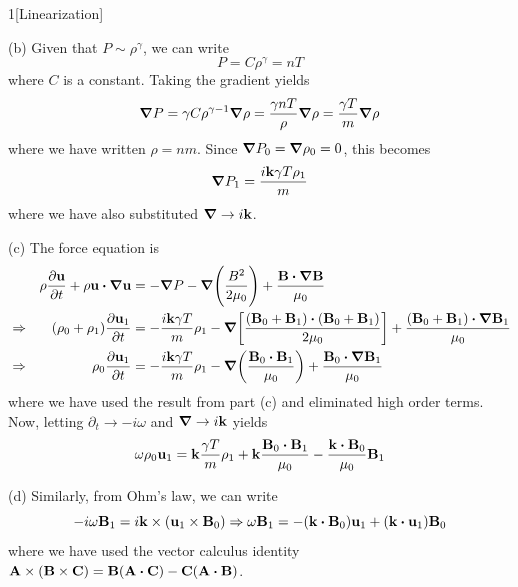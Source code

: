 \documentclass[12pt]{article}
\begin{document}
\begin{problem}{1}[Linearization]
\begin{solution}
(b) Given that $P\sim \rho^\gamma$, we can write
\begin{equation}
    P=C\rho^\gamma=nT 
\end{equation}
where $C$ is a constant. Taking the gradient yields
\begin{equation}
    \grad P=\gamma C\rho^{\gamma-1}\grad\rho =\frac{\gamma nT}{\rho}\grad\rho
    =\frac{\gamma T}{m}\grad\rho
\end{equation}
where we have written $\rho=nm$. Since $\grad P_0=\grad\rho_0=0$, this becomes
\begin{equation}
    \grad P_1=\frac{i\vb{k}\gamma T\rho_1}{m} 
\end{equation}
where we have also substituted $\grad\to i\vb{k}$.

(c) The force equation is
\begin{align}
    &&\rho\frac{\partial\vb{u}}{\partial t}+\rho\vb{u}\vdot\grad\vb{u}
    &=-\grad
    P-\grad\qty(\frac{B^2}{2\mu_0})+\frac{\vb{B}\vdot\grad\vb{B}}{\mu_0}\notag\\
    &\Rightarrow&
    \qty(\rho_0+\rho_1)\frac{\partial\vb{u}_1}{\partial t}
    &=-\frac{i\vb{k}\gamma
    T}{m}\rho_1-\grad\qty[\frac{\qty(\vb{B}_0+\vb{B}_1)\vdot\qty(\vb{B}_0+\vb{B}_1)}{2\mu_0}]
    +\frac{\qty(\vb{B}_0+\vb{B}_1)\vdot\grad\vb{B}_1}{\mu_0}\notag\\
    &\Rightarrow&
    \rho_0\frac{\partial\vb{u}_1}{\partial t}&=-\frac{i\vb{k}\gamma
    T}{m}\rho_1-\grad\qty(\frac{\vb{B}_0\vdot\vb{B}_1}{\mu_0})+\frac{\vb{B}_0\vdot\grad\vb{B}_1}{\mu_0}
\end{align}
where we have used the result from part (c) and eliminated high order terms.
Now, letting $\partial_t\to-i\omega$ and $\grad\to i\vb{k}$ yields
\begin{equation}\label{p1:force_equation}
    \omega\rho_0\vb{u}_1=\vb{k}\frac{\gamma
T}{m}\rho_1+\vb{k}\frac{\vb{B}_0\vdot\vb{B}_1}{\mu_0}-\frac{\vb{k}\vdot\vb{B}_0}{\mu_0}\vb{B}_1 
\end{equation}

(d) Similarly, from Ohm's law, we can write
\begin{equation}\label{p1:Ohms_law}
    -i\omega\vb{B}_1=i\vb{k}\times\qty(\vb{u}_1\times\vb{B}_0)
    \Rightarrow
    \omega\vb{B}_1=-\qty(\vb{k}\vdot\vb{B}_0)\vb{u}_1+\qty(\vb{k}\vdot\vb{u}_1)\vb{B}_0
\end{equation}
where we have used the vector calculus identity
$\vb{A}\times\qty(\vb{B}\times\vb{C})=\vb{B}(\vb{A}\vdot\vb{C})-\vb{C}(\vb{A}\vdot\vb{B})$. 
\end{solution}
\end{problem}
\end{document}
